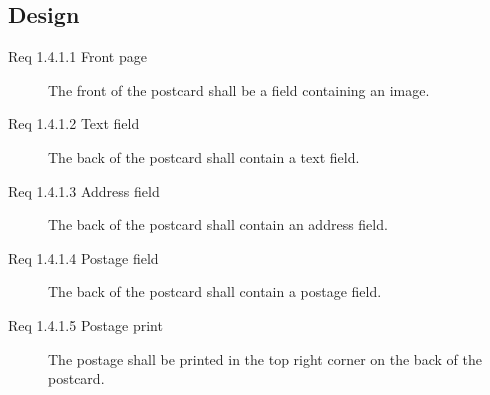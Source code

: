 \documentclass[10pt,a4paper]{article}
\begin{document}
\subsection{Design}
\begin {description}
\item [Req 1.4.1.1 Front page] The front of the postcard shall be a field containing an image.
\item [Req 1.4.1.2 Text field] The back of the postcard shall contain a text field.
\item [Req 1.4.1.3 Address field] The back of the postcard shall contain an address field.
\item [Req 1.4.1.4 Postage field] The back of the postcard shall contain a postage field. 
\item [Req 1.4.1.5 Postage print] The postage shall be printed in the top right corner on the back of the postcard. 


\end{description}
\end{document}
